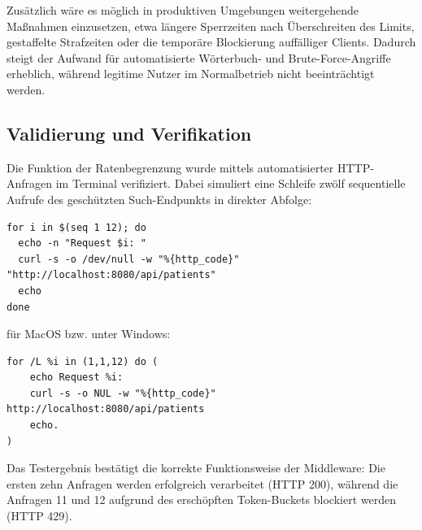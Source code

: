 Zusätzlich wäre es möglich in produktiven Umgebungen weitergehende
Maßnahmen einzusetzen, etwa längere Sperrzeiten nach Überschreiten des
Limits, gestaffelte Strafzeiten oder die temporäre Blockierung
auffälliger Clients. Dadurch steigt der Aufwand für automatisierte
Wörterbuch- und Brute-Force-Angriffe erheblich, während legitime Nutzer
im Normalbetrieb nicht beeinträchtigt werden.

\subsection{Validierung und Verifikation}
Die Funktion der Ratenbegrenzung wurde mittels automatisierter HTTP-Anfragen im Terminal verifiziert. Dabei simuliert eine Schleife zwölf sequentielle Aufrufe des geschützten Such-Endpunkts in direkter Abfolge:

\begin{verbatim}
for i in $(seq 1 12); do
  echo -n "Request $i: "
  curl -s -o /dev/null -w "%{http_code}" "http://localhost:8080/api/patients"
  echo
done
\end{verbatim}

für MacOS bzw. unter Windows:

\begin{verbatim}
for /L %i in (1,1,12) do (
    echo Request %i:
    curl -s -o NUL -w "%{http_code}" http://localhost:8080/api/patients
    echo.
)
\end{verbatim}

Das Testergebnis bestätigt die korrekte Funktionsweise der Middleware: Die ersten zehn Anfragen werden erfolgreich verarbeitet (HTTP 200), während die Anfragen 11 und 12 aufgrund des erschöpften Token-Buckets blockiert werden (HTTP 429).


